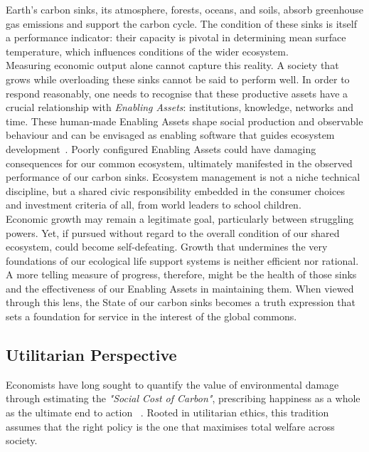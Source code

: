 \documentclass[12pt, oneside]{article}   	%
\begin{document}
Earth’s carbon sinks, its atmosphere, forests, oceans, and soils, absorb greenhouse gas emissions and support the carbon cycle.
The condition of these sinks is itself a performance indicator: their capacity is pivotal in determining mean surface temperature, which influences conditions of the wider ecosystem.\\
Measuring economic output alone cannot capture this reality.
A society that grows while overloading these sinks cannot be said to perform well.
In order to respond reasonably, one needs to recognise that these productive assets have a crucial relationship with \emph{Enabling Assets}: institutions, knowledge, networks and time.
These human-made Enabling Assets shape social production and observable behaviour and can be envisaged as enabling software that guides ecosystem development~\cite{pd3}.
Poorly configured Enabling Assets could have damaging consequences for our common ecosystem, ultimately manifested in the observed performance of our carbon sinks.
Ecosystem management is not a niche technical discipline, but a shared civic responsibility embedded in the consumer choices and investment criteria of all, from world leaders to school children.\\

Economic growth may remain a legitimate goal, particularly between struggling powers.
Yet, if pursued without regard to the overall condition of our shared ecosystem, could become self-defeating.
Growth that undermines the very foundations of our ecological life support systems is neither efficient nor rational.
A more telling measure of progress, therefore, might be the health of those sinks and the effectiveness of our Enabling Assets in maintaining them.
When viewed through this lens, the State of our carbon sinks becomes a truth expression that sets a foundation for service in the interest of the global commons.\\

\subsection{Utilitarian Perspective}

Economists have long sought to quantify the value of environmental damage through estimating the \emph{"Social Cost of Carbon"}, prescribing happiness as a whole as the ultimate end to action ~\cite{hs1}.
Rooted in utilitarian ethics, this tradition assumes that the right policy is the one that maximises total welfare across society.\\
\end{document}
